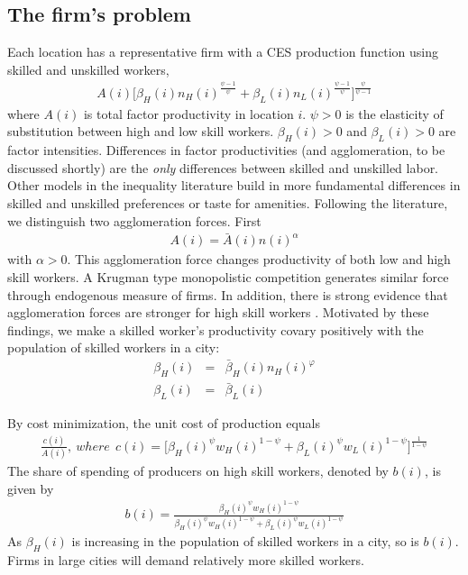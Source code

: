 \documentclass{article}
\begin{document}
\subsection{The firm's problem}
Each location has a representative firm with a CES production function using skilled and unskilled workers,
\begin{eqnarray}
	 A(i)\Big[ \beta_H(i) n_H(i)^{\frac{\psi-1}{\psi}} + \beta_L(i) n_L(i)^{\frac{\psi-1}{\psi}} \Big]^{\frac{\psi}{\psi-1}} \nonumber
\end{eqnarray}
where $A(i)$ is total factor productivity in location $i$. $\psi>0$ is the elasticity of substitution between high and low skill workers. $\beta_H(i)>0$ and $\beta_L(i)>0$ are factor intensities. Differences in factor productivities (and agglomeration, to be discussed shortly) are the \textit{only} differences between skilled and unskilled labor.  Other models in the inequality literature build in more fundamental differences in skilled and unskilled preferences or taste for amenities.
Following the literature, we distinguish two agglomeration forces. First 
\begin{eqnarray}\label{eq:agglom_general}
A(i) = \bar{A}(i) n(i)^{\alpha}
\end{eqnarray}
with $\alpha>0$. This agglomeration force changes productivity of both low and high skill workers. A Krugman type monopolistic competition generates similar force through endogenous measure of firms. In addition, there is strong evidence that agglomeration forces are stronger for high skill workers \citep{glaeser2010complementarity}.  Motivated by these findings, we make a skilled worker's productivity covary positively with the population of skilled workers in a city:
\begin{eqnarray}\label{eq:agglom_specific}
	\beta_H(i) & = & \bar{\beta}_H(i) n_H(i)^{\varphi} \nonumber \\
	\beta_L(i) & = & \bar{\beta}_L(i)
\end{eqnarray}

By cost minimization, the unit cost of production equals
\begin{eqnarray}\label{eq:unit_cost}
	 \frac{c(i)}{A(i)} ,~where~~c(i)=\Big[ \beta_H(i)^{\psi} w_H(i)^{1-\psi} + \beta_L(i)^{\psi} w_L(i)^{1-\psi}\Big]^{\frac{1}{1-\psi}}
\end{eqnarray}
The share of spending of producers on high skill workers, denoted by $b(i)$, is given by
\begin{eqnarray}\label{eq:input_share}
	b(i) = \frac{\beta_H(i)^{\psi} w_H(i)^{1-\psi}}{\beta_H(i)^{\psi} w_H(i)^{1-\psi} + \beta_L(i)^{\psi} w_L(i)^{1-\psi}}
\end{eqnarray}
As $\beta_H(i)$ is increasing in the population of skilled workers in a city, so is $b(i)$.  Firms in large cities will demand relatively more skilled workers.
\end{document}

